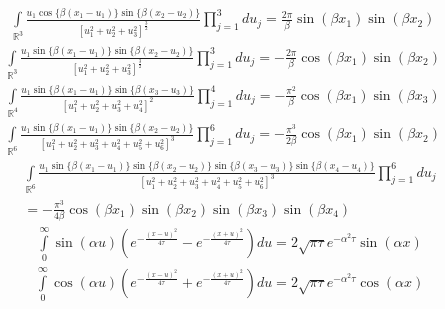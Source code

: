 \documentclass[11pt]{jfm}
\numberwithin{equation}{section}
\begin{document}
\begin{eqnarray}
\label{D7}
\int\limits_{\mathbb{R}^3 } {\frac{{u_1\cos\{\beta\left(x_1-u_1\right)\}\sin\{\beta\left(x_2-u_2\right)\}}}{{\left[ u_1^2+u_2^2+u_3^2 \right]^{\frac{3}{2}} }}}\prod\limits_{j = 1}^3 {du_j }=\frac{2\pi}{\beta}\sin\left(\beta x_1\right)\sin\left(\beta x_2\right)\quad
\end{eqnarray}
\begin{eqnarray}
\label{D8}
\int\limits_{\mathbb{R}^3 }{\frac{{u_1\sin\{\beta\left(x_1-u_1\right)\}\sin\{\beta\left(x_2-u_2\right)\}}}{{\left[ u_1^2+u_2^2+u_3^2 \right]^{\frac{3}{2}} }}}\prod\limits_{j = 1}^3 {du_j }=-\frac{2\pi}{\beta}\cos\left(\beta x_1\right)\sin\left(\beta x_2\right)\quad
\end{eqnarray}
\begin{eqnarray}
\label{D9}
\int\limits_{\mathbb{R}^4 }{\frac{{u_1\sin\{\beta\left(x_1-u_1\right)\}\sin\{\beta\left(x_3-u_3\right)\}}}{{\left[ u_1^2+u_2^2+u_3^2+u_4^2 \right]^2 }}}\prod\limits_{j = 1}^4 {du_j }=-\frac{\pi^2}{\beta}\cos\left(\beta x_1\right)\sin\left(\beta x_3\right)\quad
\end{eqnarray}
\begin{eqnarray}
\label{D10}
\int\limits_{\mathbb{R}^6 } {\frac{{u_1\sin\{\beta\left(x_1-u_1\right)\}\sin\{\beta\left(x_2-u_2\right)\}}}{{\left[ u_1^2+u_2^2+u_3^2+u_4^2+u_5^2+u_6^2 \right]^3 }}}\prod\limits_{j = 1}^6 {du_j }=-\frac{\pi^3}{2\beta}\cos\left(\beta x_1\right)\sin\left(\beta x_2\right)\quad
\end{eqnarray}
\begin{eqnarray}
\label{D11}
\int\limits_{\mathbb{R}^6 } {\frac{{u_1\sin\{\beta\left(x_1-u_1\right)\}\sin\{\beta\left(x_2-u_2\right)\}\sin\{\beta\left(x_3-u_3\right)\}\sin\{\beta\left(x_4-u_4\right)\}}}{{\left[ u_1^2+u_2^2+u_3^2+u_4^2+u_5^2+u_6^2 \right]^3 }}}\prod\limits_{j = 1}^6 {du_j }\nonumber\\
=-\frac{\pi^3}{4\beta}\cos\left(\beta x_1\right)\sin\left(\beta x_2\right)\sin\left(\beta x_3\right)\sin\left(\beta x_4\right)\qquad
\end{eqnarray}
\begin{eqnarray}
\label{D12}
\int\limits_0^\infty  {\sin \left( {\alpha u} \right)\left({e^{ - \frac{{{{\left( {x - u} \right)}^2}}}{{4\tau }}}-e^{ - \frac{{{{\left( {x + u} \right)}^2}}}{{4\tau }}}}\right)} du = 2\sqrt {\pi \tau } {e^{ - {\alpha ^2}\tau }}\sin \left( {\alpha x} \right)
\end{eqnarray}
\begin{eqnarray}
\label{D13}
\int\limits_0^\infty  {\cos \left( {\alpha u} \right)\left({e^{ - \frac{{{{\left( {x - u} \right)}^2}}}{{4\tau }}}+e^{ - \frac{{{{\left( {x + u} \right)}^2}}}{{4\tau }}}}\right)} du = 2\sqrt {\pi \tau } {e^{ - {\alpha ^2}\tau }}\cos \left( {\alpha x} \right)
\end{eqnarray}
\end{document}
